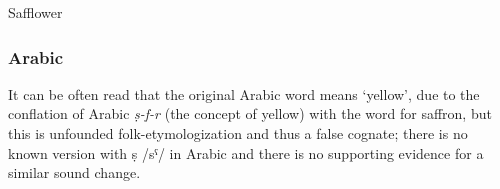 


Safflower

\subsubsection{Arabic}



It can be often read \autocite[e.g., in][124]{van_wyk_culinary_2014} that the original Arabic word means `yellow', due to the conflation of Arabic \textit{ṣ-f-r} (the concept of yellow) with the word for saffron, but this is unfounded folk-etymologization and thus a false cognate; there is no known version with ṣ /sˤ/ in Arabic and there is no supporting evidence for a similar sound change.


